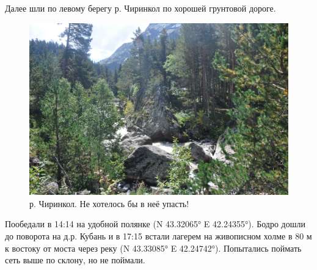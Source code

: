 Далее шли по левому берегу р. Чиринкол по хорошей грунтовой дороге.
 
\begin{figure}[h!]
	\centering
	\includegraphics[width=0.7\linewidth]{../pics/DSC_0461 2}
	\caption{р. Чиринкол. Не хотелось бы в неё упасть!}
	\label{fig:DSC_0461}
\end{figure}

Пообедали в 14:14 на удобной полянке (N 43.32065° E 42.24355°). Бодро дошли до поворота на д.р. Кубань и в 17:15 встали лагерем на живописном холме в 80 м к востоку от моста через реку (N 43.33085° E 42.24742°). Попытались поймать сеть выше по склону, но не поймали.

\clearpage